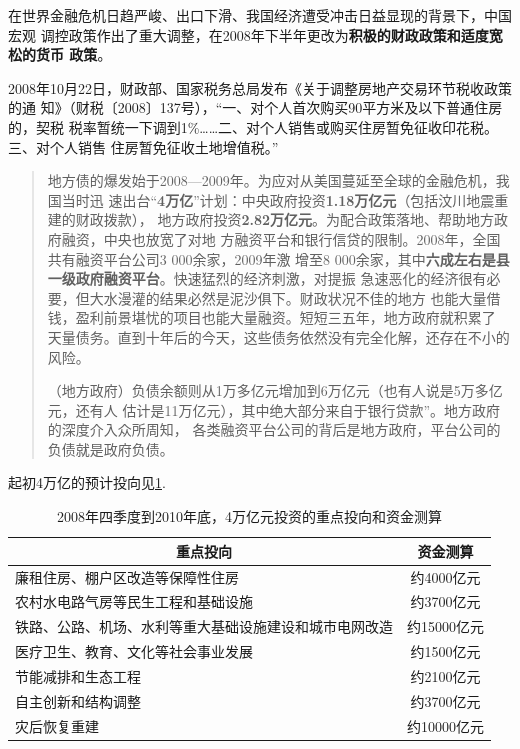 在世界金融危机日趋严峻、出口下滑、我国经济遭受冲击日益显现的背景下，中国宏观
调控政策作出了重大调整，在2008年下半年更改为\textbf{积极的财政政策和适度宽松的货币
  政策}。

2008年10月22日，财政部、国家税务总局发布《关于调整房地产交易环节税收政策的通
知》（财税〔2008〕137号），“一、对个人首次购买90平方米及以下普通住房的，契税
税率暂统一下调到1\%……二、对个人销售或购买住房暂免征收印花税。三、对个人销售
住房暂免征收土地增值税。”

\begin{quotation}
  地方债的爆发始于2008—2009年。为应对从美国蔓延至全球的金融危机，我国当时迅
  速出台“\textbf{4万亿}”计划：中央政府投资\textbf{1.18万亿元}（包括汶川地震重建的财政拨款），
  地方政府投资\textbf{2.82万亿元}。为配合政策落地、帮助地方政府融资，中央也放宽了对地
  方融资平台和银行信贷的限制。2008年，全国共有融资平台公司3 000余家，2009年激
  增至8 000余家，其中\textbf{六成左右是县一级政府融资平台}。快速猛烈的经济刺激，对提振
  急速恶化的经济很有必要，但大水漫灌的结果必然是泥沙俱下。财政状况不佳的地方
  也能大量借钱，盈利前景堪忧的项目也能大量融资。短短三五年，地方政府就积累了
  天量债务。直到十年后的今天，这些债务依然没有完全化解，还存在不小的风险。\cite{zhishenshinei}


  （地方政府）负债余额则从1万多亿元增加到6万亿元（也有人说是5万多亿元，还有人
  估计是11万亿元），其中绝大部分来自于银行贷款”。地方政府的深度介入众所周知，
  各类融资平台公司的背后是地方政府，平台公司的负债就是政府负债。\cite{yangdi}
\end{quotation}

起初4万亿的预计投向见\cref{tab:4wanyi}.

\begin{table}[]
\centering
\begin{tabular}{@{}lc@{}}
\toprule
\multicolumn{1}{c}{重点投向}    & 资金测算     \\ \midrule
廉租住房、棚户区改造等保障性住房            & 约4000亿元  \\
农村水电路气房等民生工程和基础设施           & 约3700亿元  \\
铁路、公路、机场、水利等重大基础设施建设和城市电网改造 & 约15000亿元 \\
医疗卫生、教育、文化等社会事业发展           & 约1500亿元  \\
节能减排和生态工程                   & 约2100亿元  \\
自主创新和结构调整                   & 约3700亿元  \\
灾后恢复重建                      & 约10000亿元 \\ \bottomrule
\end{tabular}
\caption{2008年四季度到2010年底，4万亿元投资的重点投向和资金测算}
\label{tab:4wanyi}
\end{table}

